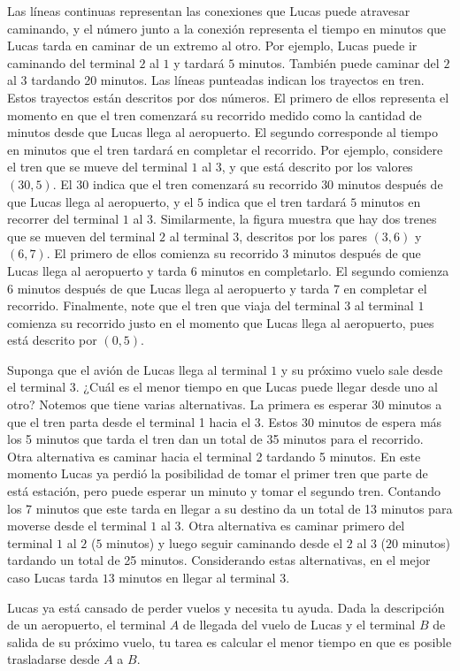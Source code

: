 \documentclass{oci}
\begin{document}
\begin{problemDescription}
  Las líneas continuas representan las conexiones que Lucas puede atravesar
  caminando, y el número junto a la conexión representa el tiempo en minutos que Lucas tarda
  en caminar de un extremo al otro. Por ejemplo, Lucas puede ir caminando del terminal $2$ al $1$
  y tardará $5$ minutos. También puede caminar del $2$ al $3$ tardando 20 minutos.
  Las líneas punteadas indican los trayectos en tren.
  Estos trayectos están descritos por dos números. El primero de ellos
  representa el momento en que el tren comenzará su recorrido 
  medido como la cantidad de minutos desde que Lucas llega al aeropuerto.
  El segundo corresponde al tiempo en minutos que el tren tardará en
  completar el recorrido.
  Por ejemplo, considere el tren que se mueve del terminal $1$ al $3$, y que está
  descrito por los valores $(30, 5)$. El $30$ indica que el tren comenzará su recorrido 
  $30$ minutos después de que Lucas llega al aeropuerto, y el $5$ indica que el tren tardará $5$ minutos
  en recorrer del terminal $1$ al $3$.
  Similarmente, la figura muestra que hay dos trenes que se mueven del terminal $2$ al terminal $3$, descritos por los pares $(3,6)$ y $(6,7)$.
  El primero de ellos comienza su recorrido $3$ minutos después de que Lucas llega al aeropuerto y tarda $6$ minutos en completarlo.
  El segundo comienza $6$ minutos después de que Lucas llega al aeropuerto y tarda $7$ en completar el recorrido.
  Finalmente, note que el tren que viaja del terminal 
  $3$ al terminal $1$ comienza su recorrido justo en el momento
  que Lucas llega al aeropuerto, pues está descrito por $(0,5)$.

  Suponga que el avión de Lucas llega al terminal $1$ y su próximo vuelo sale desde
  el terminal $3$. ¿Cuál es el menor tiempo en que Lucas puede llegar desde uno al otro?
  Notemos que tiene varias
  alternativas.
  La primera es esperar 30 minutos a que el tren parta desde el terminal 1 hacia
  el 3.
  Estos 30 minutos de espera más los 5 minutos que tarda el tren dan un total de
  35 minutos para el recorrido.
  Otra alternativa es caminar hacia el terminal 2 tardando 5 minutos.
  En este momento Lucas ya perdió la posibilidad de tomar el primer tren que
  parte de está estación, pero puede esperar un minuto y tomar el segundo tren.
  Contando los 7 minutos que este tarda en llegar a su destino da un total de 13
  minutos para moverse desde el terminal $1$ al $3$.
  Otra alternativa es caminar primero del terminal $1$ al $2$ ($5$ minutos) 
  y luego seguir caminando desde el $2$ al $3$ ($20$ minutos) 
  tardando un total de 25 minutos.
  Considerando estas alternativas, en el mejor caso Lucas tarda 
  $13$ minutos en llegar al terminal $3$.

  Lucas ya está cansado de perder vuelos y necesita tu ayuda.
  Dada la descripción de un aeropuerto, el terminal $A$ de llegada del vuelo de Lucas y el terminal $B$
  de salida de su próximo vuelo, tu tarea es calcular el menor tiempo en que es posible
  trasladarse desde $A$ a $B$.
  

\end{problemDescription}
\end{document}
